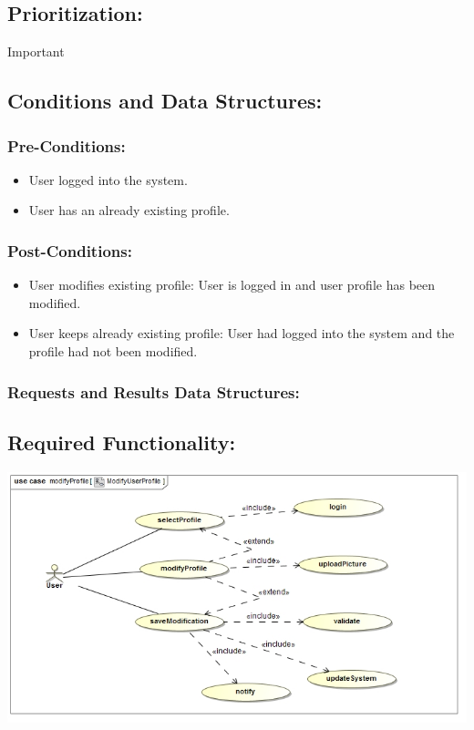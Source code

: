 \documentclass[a4paper,11pt]{article}
\begin{document}
\subsection{Prioritization:}
\textbf{}Important
\subsection{Conditions and Data Structures:}
\subsubsection*{Pre-Conditions:}
\begin{itemize}
\item User logged into the system. 
\item User has an already existing profile. 
\end{itemize}
\subsubsection*{Post-Conditions:}
\begin{itemize}
\item User modifies existing profile: User is logged in and user profile has been modified. 
\item User keeps already existing profile: User had logged into the system and the profile had not been modified. 
\end{itemize}
\subsubsection*{Requests and Results Data Structures:}
\subsection{Required Functionality:}
\includegraphics[width=1\linewidth]{./Images/UserProfile/ModifyUserProfileUseCase}
\end{document}
